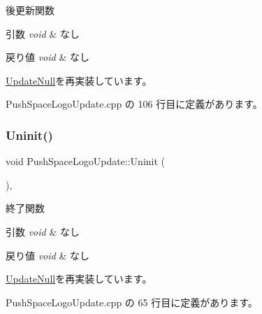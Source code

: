 後更新関数 


\begin{DoxyParams}{引数}
{\em void} & なし \\
\hline
\end{DoxyParams}

\begin{DoxyRetVals}{戻り値}
{\em void} & なし \\
\hline
\end{DoxyRetVals}


\mbox{\hyperlink{class_update_null_a8d335882bce4eab384d44c4bae474ee5}{Update\+Null}}を再実装しています。



 Push\+Space\+Logo\+Update.\+cpp の 106 行目に定義があります。

\mbox{\label{class_push_space_logo_update_a94f791874cb6160cd33cd7068fcde0d0}} 
\subsubsection{\texorpdfstring{Uninit()}{Uninit()}}
{\footnotesize\ttfamily void Push\+Space\+Logo\+Update\+::\+Uninit (\begin{DoxyParamCaption}{ }\end{DoxyParamCaption})\hspace{0.3cm}{\ttfamily [override]}, {\ttfamily [virtual]}}



終了関数 


\begin{DoxyParams}{引数}
{\em void} & なし \\
\hline
\end{DoxyParams}

\begin{DoxyRetVals}{戻り値}
{\em void} & なし \\
\hline
\end{DoxyRetVals}


\mbox{\hyperlink{class_update_null_a820189d686ec62f7a30d547118c419df}{Update\+Null}}を再実装しています。



 Push\+Space\+Logo\+Update.\+cpp の 65 行目に定義があります。

\mbox{\label{class_push_space_logo_update_aa07fe6f6f4f072e1f81bc6708dd4727e}} 
